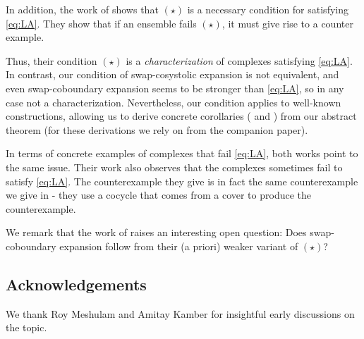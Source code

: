 \documentclass{article}[11pt]
\begin{document}
In addition, the work of \cite{BafnaM2023} shows that $(\star)$ is a necessary condition for satisfying \eqref{eq:LA}. They show that if an ensemble fails $(\star)$, it must give rise to a counter example. %

Thus, their condition $(\star)$ is a {\em characterization} of complexes satisfying \eqref{eq:LA}. In contrast, our condition of swap-cosystolic expansion is not equivalent, and even swap-coboundary expansion seems to be stronger than \eqref{eq:LA}, so in any case not a characterization. Nevertheless, our condition applies to well-known constructions, allowing us to derive concrete corollaries ( and ) from our abstract theorem (for these derivations we rely on  from the companion paper). 

In terms of concrete examples of complexes that fail \eqref{eq:LA}, both works point to the same issue. Their work also observes that the \cite{LubotzkySV2005b} complexes sometimes fail to satisfy \eqref{eq:LA}. The counterexample they give is in fact the same counterexample we give in  - they use a cocycle that comes from a cover to produce the counterexample.


We remark that the work of \cite{BafnaM2023} raises an interesting open question: Does swap-coboundary expansion follow from their (a priori) weaker variant of $(\star)$?

\subsection*{Acknowledgements}
We thank Roy Meshulam and Amitay Kamber for insightful early discussions on the topic.







\printbibliography

%
\end{document}
